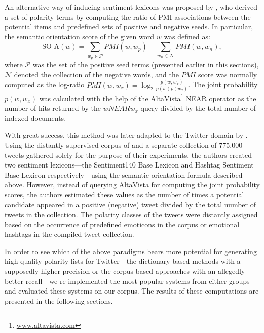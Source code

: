 An alternative way of inducing sentiment lexicons was proposed by
\citet{Turney:03}, who derived a set of polarity terms by computing
the ratio of PMI-associations between the potential items and
predefined sets of positive and negative seeds.  In particular, the
semantic orientation score of the given word $w$ was defined as:
\begin{equation*}
  \textrm{SO-A}(w) = \sum_{w_p\in\mathcal{P}}PMI(w, w_p) - \sum_{w_n\in\mathcal{N}}PMI(w, w_n),
\end{equation*}
where $\mathcal{P}$ was the set of the positive seed terms (presented
earlier in this sections), $\mathcal{N}$ denoted the collection of the
negative words, and the $PMI$ score was normally computed as the
log-ratio $PMI(w, w_x) = \log_2\frac{p(w, w_x)}{p(w)p(w_x)}$.  The
joint probability $p(w, w_x)$ was calculated with the help of the
AltaVista\footnote{\url{www.altavista.com}} NEAR operator as the
number of hits returned by the $w NEAR w_x$ query divided by the total
number of indexed documents.

With great success, this method was later adapted to the Twitter
domain by \citet{Kiritchenko:14}.  Using the distantly supervised
corpus of \citet{Go:09} and a separate collection of 775,000 tweets
gathered solely for the purpose of their experiments, the authors
created two sentiment lexicons---the Sentiment140 Base Lexicon and
Hashtag Sentiment Base Lexicon respectively---using the semantic
orientation formula described above.  However, instead of querying
AltaVista for computing the joint probability scores, the authors
estimated these values as the number of times a potential candidate
appeared in a positive (negative) tweet divided by the total number of
tweets in the collection.  The polarity classes of the tweets were
distantly assigned based on the occurrence of predefined emoticons in
the \citet{Go:09} corpus or emotional hashtags in the compiled tweet
collection.


In order to see which of the above paradigms bears more potential for
generating high-quality polarity lists for Twitter---the
dictionary-based methods with a supposedly higher precision or the
corpus-based approaches with an allegedly better recall---we
re-implemented the most popular systems from either groups and
evaluated these systems on our corpus.  The results of these
computations are presented in the following sections.


